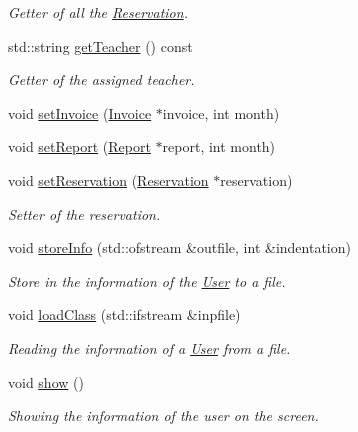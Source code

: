 \begin{DoxyCompactItemize}
\begin{DoxyCompactList}\small\item\em Getter of all the \mbox{\hyperlink{class_reservation}{Reservation}}. \end{DoxyCompactList}\item 
std\+::string \mbox{\hyperlink{class_user_aafe37a3bb0e14e669e42f2fee9e0ce29}{get\+Teacher}} () const
\begin{DoxyCompactList}\small\item\em Getter of the assigned teacher. \end{DoxyCompactList}\item 
void \mbox{\hyperlink{class_user_ad0432b83c7379ca57ed782d2929f3b8a}{set\+Invoice}} (\mbox{\hyperlink{class_invoice}{Invoice}} $\ast$invoice, int month)
\item 
void \mbox{\hyperlink{class_user_a0cdc359989bc67c3a135737cf1232a49}{set\+Report}} (\mbox{\hyperlink{class_report}{Report}} $\ast$report, int month)
\item 
void \mbox{\hyperlink{class_user_ab0e9dba3828977748ad6316eb346a854}{set\+Reservation}} (\mbox{\hyperlink{class_reservation}{Reservation}} $\ast$reservation)
\begin{DoxyCompactList}\small\item\em Setter of the reservation. \end{DoxyCompactList}\item 
void \mbox{\hyperlink{class_user_aac5ff0f6899f3ce56d1b2d12ed557c79}{store\+Info}} (std\+::ofstream \&outfile, int \&indentation)
\begin{DoxyCompactList}\small\item\em Store in the information of the \mbox{\hyperlink{class_user}{User}} to a file. \end{DoxyCompactList}\item 
void \mbox{\hyperlink{class_user_abc12a9ca668bd860a3d6d2ae4791997d}{load\+Class}} (std\+::ifstream \&inpfile)
\begin{DoxyCompactList}\small\item\em Reading the information of a \mbox{\hyperlink{class_user}{User}} from a file. \end{DoxyCompactList}\item 
\mbox{\label{class_user_ac8a201055d02b313721e56c4c0f6af82}} 
void \mbox{\hyperlink{class_user_ac8a201055d02b313721e56c4c0f6af82}{show}} ()
\begin{DoxyCompactList}\small\item\em Showing the information of the user on the screen. \end{DoxyCompactList}\item 

\end{DoxyCompactItemize}
